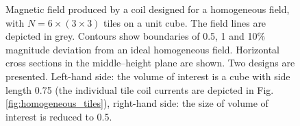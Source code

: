\begin{figure}[bth]
  \centering
  \quad
  \caption{Magnetic field produced by a coil designed for a homogeneous field, with $N = 6 \times (3 \times 3)$ tiles on a unit cube. The field lines are depicted in grey. Contours show boundaries of 0.5, 1 and 10\% magnitude deviation from an ideal homogeneous field. Horizontal cross sections in the middle--height plane are shown. Two designs are presented. Left-hand side: the volume of interest is a cube with side length 0.75 (the individual tile coil currents are depicted in Fig.\,\ref{fig:homogeneous_tiles}), right-hand side: the size of volume of interest is reduced to 0.5.}
  \label{fig:homogeneous_performance}
\end{figure}


